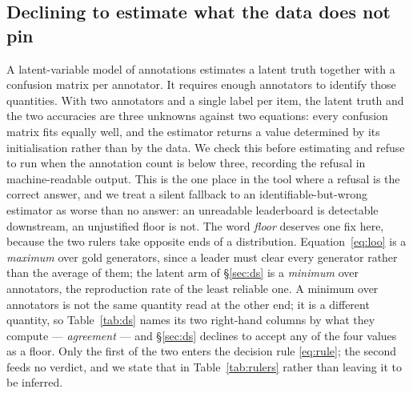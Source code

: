 \documentclass{article}
\begin{document}
\subsection{Declining to estimate what the data does not pin}
\label{sec:refuse} A latent-variable model of annotations \cite{dawidskene1979} estimates a latent truth together with a confusion matrix per annotator. It requires enough annotators to identify those quantities. With two annotators and a single label per item, the latent truth and the two accuracies are three unknowns against two equations: every confusion matrix fits equally well, and the estimator returns a value determined by its initialisation rather than by the data. We check this before estimating and refuse to run when the annotation count is below three, recording the refusal in machine-readable output. This is the one place in the tool where a refusal is the correct answer, and we treat a silent fallback to an identifiable-but-wrong estimator as worse than no answer: an unreadable leaderboard is detectable downstream, an unjustified floor is not. The word \emph{floor} deserves one fix here, because the two rulers take opposite ends of a distribution. Equation~\eqref{eq:loo} is a \emph{maximum} over gold generators, since a leader must clear every generator rather than the average of them; the latent arm of \S\ref{sec:ds} is a \emph{minimum} over annotators, the reproduction rate of the least reliable one. A minimum over annotators is not the same quantity read at the other end; it is a different quantity, so Table~\ref{tab:ds} names its two right-hand columns by what they compute --- \emph{agreement} --- and \S\ref{sec:ds} declines to accept any of the four values as a floor. Only the first of the two enters the decision rule \eqref{eq:rule}; the second feeds no verdict, and we state that in Table~\ref{tab:rulers} rather than leaving it to be inferred.


\bigskip
\noindent{}
\end{document}
